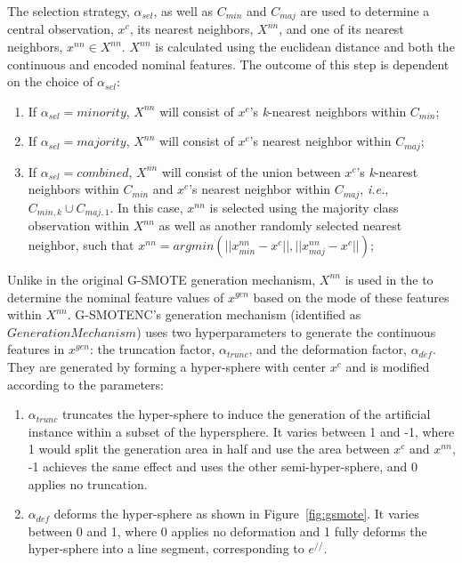 The selection strategy, $\alpha_{sel}$, as well as $C_{min}$ and $C_{maj}$ are
used to determine a central observation, $x^c$, its nearest neighbors,
$X^{nn}$, and one of its nearest neighbors, $x^{nn} \in X^{nn}$. $X^{nn}$ is
calculated using the euclidean distance and both the continuous and encoded
nominal features. The outcome of this step is dependent on the choice of
$\alpha_{sel}$:

\begin{enumerate}
    \item If $\alpha_{sel} = \mathit{minority}$, $X^{nn}$ will consist of
        $x^c$'s \textit{k}-nearest neighbors within $C_{min}$;
    \item If $\alpha_{sel} = \mathit{majority}$, $X^{nn}$ will consist of
        $x^c$'s nearest neighbor within $C_{maj}$; 
    \item If $\alpha_{sel} = \mathit{combined}$, $X^{nn}$ will consist of the
        union between $x^c$'s \textit{k}-nearest neighbors within $C_{min}$
        and $x^c$'s nearest neighbor within $C_{maj}$, \textit{i.e.},
        $C_{min,k} \cup C_{maj,1}$. In this case, $x^{nn}$ is selected using
        the majority class observation within $X^{nn}$ as well as another
        randomly selected nearest neighbor, such that $x^{nn} =
        argmin(||x^{nn}_{min}-x^c||, ||x^{nn}_{maj}-x^c||)$;
\end{enumerate}

Unlike in the original G-SMOTE generation mechanism, $X^{nn}$ is used in the
to determine the nominal feature values of $x^{gen}$ based on the mode of
these features within $X^{nn}$. G-SMOTENC's generation mechanism (identified
as $GenerationMechanism$) uses two hyperparameters to generate the continuous
features in $x^{gen}$: the truncation factor, $\alpha_{trunc}$, and the
deformation factor, $\alpha_{def}$. They are generated by forming a
hyper-sphere with center $x^c$ and is modified according to the parameters:

\begin{enumerate}

    \item $\alpha_{trunc}$ truncates the hyper-sphere to induce the generation
        of the artificial instance within a subset of the hypersphere. It
        varies between 1 and -1, where 1 would split the generation area in
        half and use the area between $x^c$ and $x^{nn}$, -1 achieves the same
        effect and uses the other semi-hyper-sphere, and 0 applies no
        truncation.

    \item $\alpha_{def}$ deforms the hyper-sphere as shown in
        Figure~\ref{fig:gsmote}. It varies between 0 and 1, where 0 applies no
        deformation and 1 fully deforms the hyper-sphere into a line segment,
        corresponding to $e^{//}$.

\end{enumerate}

